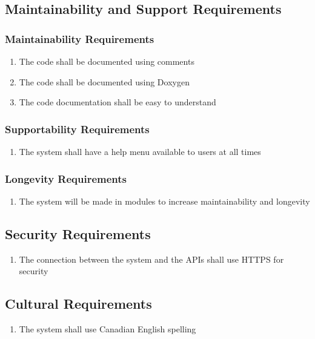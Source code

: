 \documentclass[12pt, titlepage]{article}
\begin{document}
\subsection{Maintainability and Support Requirements}
\subsubsection{Maintainability Requirements}
\begin{enumerate}[start=1, label={MS\arabic*.}]
    \item The code shall be documented using comments
    \item The code shall be documented using Doxygen
    \item The code documentation shall be easy to understand
\end{enumerate}
\subsubsection{Supportability Requirements}
\begin{enumerate}[start=4, label={MS\arabic*.}]
    \item The system shall have a help menu available to users at all times
\end{enumerate}
\subsubsection{Longevity Requirements}
\begin{enumerate}[start=5, label={MS\arabic*.}]
    \item The system will be made in modules to increase maintainability and longevity
\end{enumerate}

\subsection{Security Requirements}
\begin{enumerate}[start=1, label={S\arabic*.}]
    \item The connection between the system and the APIs shall use HTTPS for security
\end{enumerate}

\subsection{Cultural Requirements}
\begin{enumerate}[start=1, label={C\arabic*.}]
    \item The system shall use Canadian English spelling
\end{enumerate}
\end{document}
